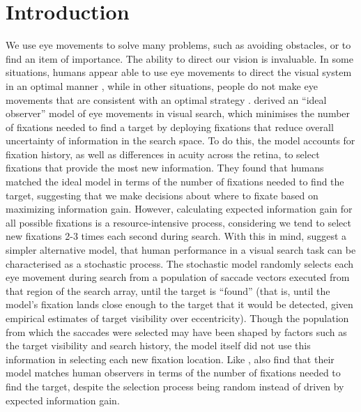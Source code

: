 \documentclass[vision,article,submit,moreauthors,pdftex,10pt,a4paper]{mdpi}
\begin{document}
\section{Introduction}
We use eye movements to solve many problems, such as avoiding obstacles, or to find an item of importance. The ability to direct our vision is invaluable. In some situations, humans appear able to use eye movements to direct the visual system in an optimal manner \cite{najemnik2005optimal}, while in other situations, people do not make eye movements that are consistent with an optimal strategy \cite{clarke2015failure, morvan2012human}. 
\citeauthor{najemnik2005optimal} \cite{najemnik2005optimal} derived an “ideal observer” model of eye movements in visual search, which minimises the number of fixations needed to find a target by deploying fixations that reduce overall uncertainty of information in the search space. To do this, the model accounts for fixation history, as well as differences in acuity across the retina, to select fixations that provide the most new information. They found that humans matched the ideal model in terms of the number of fixations needed to find the target, suggesting that we make decisions about where to fixate based on maximizing information gain. However, calculating expected information gain for all possible fixations is a resource-intensive process, considering we tend to select new fixations 2-3 times each second during search. With this in mind, \citeauthor{clarke2016stocha} \cite{clarke2016stocha} suggest a simpler alternative model, that human performance in a visual search task can be characterised as a stochastic process. The stochastic model randomly selects each eye movement during search from a population of saccade vectors executed from that region of the search array, until the target is “found” (that is, until the model’s fixation lands close enough to the target that it would be detected, given empirical estimates of target visibility over eccentricity). Though the population from which the saccades were selected may have been shaped by factors such as the target visibility and search history, the model itself did not use this information in selecting each new fixation location. Like \citeauthor{najemnik2005optimal} \cite{najemnik2005optimal}, \citeauthor{clarke2015failure} \cite{clarke2015failure} also find that their model matches human observers in terms of the number of fixations needed to find the target, despite the selection process being random instead of driven by expected information gain. 
\end{document}
